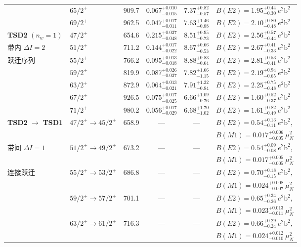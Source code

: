 \begin{table}[!htbp]
\begin{tabularx}{\textwidth}{p{2.2cm} p{2.0cm} c c c >{\raggedright\arraybackslash}X}
& $65/2^+$ & 909.7 & $0.067_{-0.015}^{+0.010}$ & $7.37_{-0.57}^{+0.82}$ & $B(E2) = 1.95_{-0.30}^{+0.44}\ e^2\mathrm{b}^2$ \\
& $69/2^+$ & 962.5 & $0.047_{-0.011}^{+0.017}$ & $7.63_{-0.88}^{+1.46}$ & $B(E2) = 2.10_{-0.48}^{+0.80}\ e^2\mathrm{b}^2$ \\
\hline
\shortstack[l]{\textbf{TSD2}\\$(n_w=1)$} & $47/2^+$ & 654.6 & $0.215_{-0.048}^{+0.037}$ & $8.51_{-0.73}^{+0.95}$ & $B(E2) = 2.56_{-0.44}^{+0.57}\ e^2\mathrm{b}^2$ \\
带内 $\Delta I = 2$ & $51/2^+$ & 711.2 & $0.144_{-0.022}^{+0.017}$ & $8.67_{-0.53}^{+0.66}$ & $B(E2) = 2.67_{-0.33}^{+0.41}\ e^2\mathrm{b}^2$ \\
跃迁序列 & $55/2^+$ & 766.2 & $0.095_{-0.018}^{+0.013}$ & $8.88_{-0.64}^{+0.83}$ & $B(E2) = 2.81_{-0.41}^{+0.53}\ e^2\mathrm{b}^2$ \\
& $59/2^+$ & 819.9 & $0.087_{-0.037}^{+0.026}$ & $7.82_{-1.15}^{+1.66}$ & $B(E2) = 2.19_{-0.65}^{+0.94}\ e^2\mathrm{b}^2$ \\
& $63/2^+$ & 872.9 & $0.064_{-0.021}^{+0.013}$ & $7.91_{-0.84}^{+1.32}$ & $B(E2) = 2.25_{-0.48}^{+0.75}\ e^2\mathrm{b}^2$ \\
& $67/2^+$ & 926.5 & $0.075_{-0.025}^{+0.017}$ & $6.66_{-0.76}^{+1.09}$ & $B(E2) = 1.60_{-0.37}^{+0.52}\ e^2\mathrm{b}^2$ \\
& $71/2^+$ & 980.2 & $0.056_{-0.029}^{+0.017}$ & $6.68_{-1.02}^{+1.70}$ & $B(E2) = 1.61_{-0.49}^{+0.82}\ e^2\mathrm{b}^2$ \\
\hline
\textbf{TSD2} $\to$ \textbf{TSD1} & $47/2^+ \to 45/2^+$ & 658.9 & — & — & $B(E2) = 0.54_{-0.11}^{+0.13}\ e^2\mathrm{b}^2$, \\ & & & & & $B(M1) = 0.017_{-0.005}^{+0.006}\ \mu_N^2$ \\
带间 $\Delta I = 1$ & $51/2^+ \to 49/2^+$ & 673.2 & — & — & $B(E2) = 0.54_{-0.08}^{+0.09}\ e^2\mathrm{b}^2$, \\ & & & & & $B(M1) = 0.017_{-0.005}^{+0.005}\ \mu_N^2$ \\
连接跃迁 & $55/2^+ \to 53/2^+$ & 686.8 & — & — & $B(E2) = 0.70_{-0.15}^{+0.18}\ e^2\mathrm{b}^2$, \\ & & & & & $B(M1) = 0.024_{-0.007}^{+0.008}\ \mu_N^2$ \\
& $59/2^+ \to 57/2^+$ & 701.1 & — & — & $B(E2) = 0.65_{-0.26}^{+0.34}\ e^2\mathrm{b}^2$, \\ & & & & & $B(M1) = 0.023_{-0.011}^{+0.013}\ \mu_N^2$ \\
& $63/2^+ \to 61/2^+$ & 716.3 & — & — & $B(E2) = 0.66_{-0.24}^{+0.29}\ e^2\mathrm{b}^2$, \\ & & & & & $B(M1) = 0.024_{-0.010}^{+0.012}\ \mu_N^2$ \\
\hline\hline
\end{tabularx}
\end{table}


